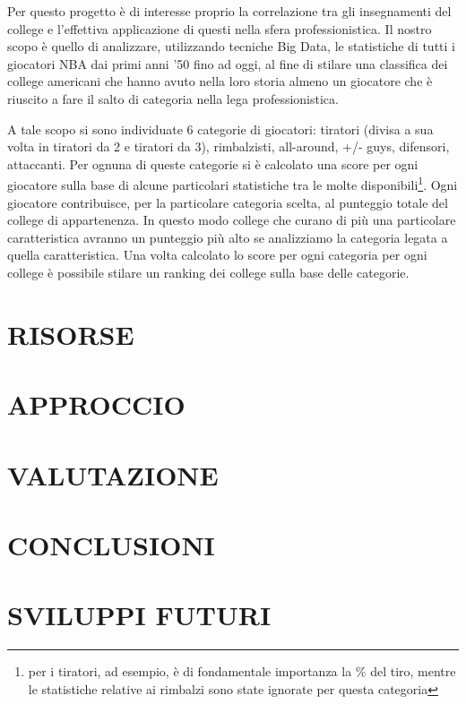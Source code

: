 \documentclass[10pt,a4paper,onecolumn]{article}
\begin{document}
Per questo progetto è di interesse proprio la correlazione tra gli insegnamenti del college e l'effettiva applicazione di questi nella sfera professionistica. Il nostro scopo è quello di analizzare, utilizzando tecniche Big Data, le statistiche di tutti i giocatori NBA dai primi anni '50 fino ad oggi, al fine di stilare una classifica dei college americani che hanno avuto nella loro storia almeno un giocatore che è riuscito a fare il salto di categoria nella lega professionistica.

A tale scopo si sono individuate 6 categorie di giocatori: tiratori (divisa a sua volta in tiratori da 2 e tiratori da 3), rimbalzisti, all-around, +/- guys, difensori, attaccanti. Per ognuna di queste categorie si è calcolato una score per ogni giocatore sulla base di alcune particolari statistiche tra le molte disponibili\footnote{per i tiratori, ad esempio, è di fondamentale importanza la \% del tiro, mentre le statistiche relative ai rimbalzi sono state ignorate per questa categoria}. Ogni giocatore contribuisce, per la particolare categoria scelta, al punteggio totale del college di appartenenza. In questo modo college che curano di più una particolare caratteristica avranno un punteggio più alto se analizziamo la categoria legata a quella caratteristica. Una volta calcolato lo score per ogni categoria per ogni college è possibile stilare un ranking dei college sulla base delle categorie.


\section{RISORSE}
\section{APPROCCIO}
\section{VALUTAZIONE}

\section{CONCLUSIONI}

\section{SVILUPPI FUTURI}
\end{document}

